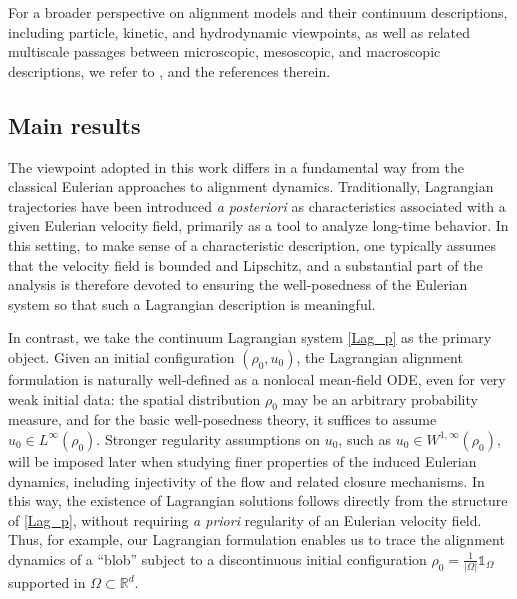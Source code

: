 \documentclass[10pt,reqno]{amsart}
\numberwithin{equation}{section}
\newcommand{\R}{\mathbb R}
\begin{document}
For a broader perspective on alignment models and their continuum descriptions, including particle, kinetic, and hydrodynamic viewpoints,  as well as related multiscale passages between microscopic, mesoscopic, and macroscopic descriptions, we refer to \cite{CCP17, CFTV10, CHL17, MT14,  MMPZ19, PTpre, Shv21, Shv24, Tad21, Tad23}, and the references therein. 

 




                      


 \subsection{Main results}
 The viewpoint adopted in this work differs in a fundamental way from the classical Eulerian approaches to alignment dynamics. Traditionally, Lagrangian trajectories have been introduced \emph{a posteriori} as characteristics associated with a given Eulerian velocity field, primarily as a tool to analyze long-time behavior. In this setting, to make sense of a characteristic description, one typically assumes that the velocity field is bounded and Lipschitz, and a substantial part of the analysis is therefore devoted to ensuring the well-posedness of the Eulerian system so that such a Lagrangian description is meaningful.
 
In contrast, we take the continuum Lagrangian system \eqref{Lag_p} as the primary object. Given an initial configuration $(\rho_0,u_0)$, the Lagrangian alignment formulation is naturally well-defined as a nonlocal mean-field ODE, even for very weak initial data: the spatial distribution $\rho_0$ may be an arbitrary probability measure,
and for the basic well-posedness theory, it suffices to assume $u_0\in L^\infty(\rho_0)$. Stronger regularity assumptions on $u_0$, such as $u_0\in W^{1,\infty}(\rho_0)$, will be imposed later when studying finer properties of the induced Eulerian dynamics, including injectivity of the flow and related closure mechanisms. In this way, the existence of Lagrangian solutions follows directly from the structure of \eqref{Lag_p}, without requiring \emph{a priori} regularity of an Eulerian velocity field. Thus, for example, our Lagrangian formulation enables us to trace the alignment dynamics of a ``blob'' subject to a discontinuous initial configuration $\displaystyle \rho_0=\frac{1}{|\Omega|}{\mathds 1}_\Omega$ supported in $\Omega \subset \R^d$.
 
\end{document}
